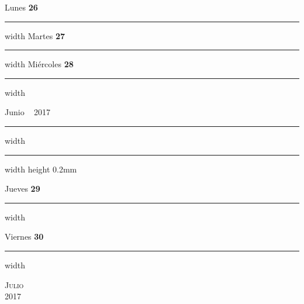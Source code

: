 \documentclass[portrait]{article}
\newcommand\blankpage{%
\null 
\thispagestyle{empty}%
\addtocounter{page}{-1}%
\newpage}
\begin{document}
\hfill \break \hfill \break 
{\Large Lunes} {\LARGE\color{Dandelion} \textbf{26}}  \hfill \break\hrule width \hsize \kern 2pt\hfill \break \hfill \break \hfill \break \hfill \break \hfill \break \break 
\hfill \break \hfill \break 
{\Large Martes} {\LARGE\color{Dandelion} \textbf{27}}  \hfill \break\hrule width \hsize \kern 2pt\hfill \break \hfill \break \hfill \break \hfill \break \hfill \break \break 
\hfill \break \hfill \break 
{\Large Mi\'ercoles} {\LARGE\color{Dandelion} \textbf{28}}  \hfill \break\hrule width \hsize \kern 2pt\hfill \break \hfill \break \hfill \break \hfill \break \hfill \break \break 
\newpage {} \begin{flushright}{\Huge Junio} ~ {\color{Dandelion} \large 2017} \end{flushright} 
\hrule depth 0.3mm width \hsize \kern 1pt \hrule width \hsize height 0.2mm 
\hfill \break 
 \begin{flushright}{\Large Jueves} {\LARGE\color{Dandelion} \textbf{29}}\end{flushright}\hrule width \hsize \kern 2pt\hfill \break \hfill \break \hfill \break \hfill \break \hfill \break \break
\hfill \break 
 \begin{flushright}{\Large Viernes} {\LARGE\color{Dandelion} \textbf{30}}\end{flushright}\hrule width \hsize \kern 2pt\hfill \break \hfill \break \hfill \break \hfill \break \hfill \break \break
\afterpage{\blankpage}\newpage {}\pagestyle{empty} %
\noindent 
{} %
\begin{center} 
\textsc{\Huge \color{Dandelion}Julio}\\ %
\textsc{\large 2017} %
\end{center} 
\end{document}
